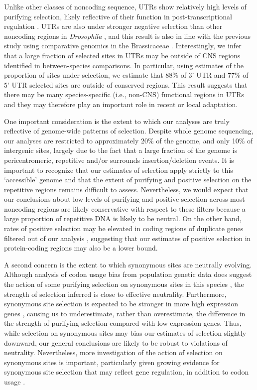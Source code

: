 Unlike other classes of noncoding sequence, UTRs show relatively high levels of purifying selection, likely reflective of their function in post-transcriptional regulation \citep{kim2014}. UTRs are also under stronger negative selection than other noncoding regions in \textit{Drosophila} \citep{andolfatto2005}, and this result is also in line with the previous study using comparative genomics in the Brassicaceae \citep{Haudry2013-qe}. Interestingly, we infer that a large fraction of selected sites in UTRs may be outside of CNS regions identified in between-species comparisons. In particular, using estimates of the proportion of sites under selection, we estimate that 88\% of 3’ UTR and 77\% of 5’ UTR selected sites are outside of conserved regions.  This result suggests that there may be many species-specific (i.e., non-CNS) functional regions in UTRs and they may therefore play an important role in recent or local adaptation.

One important consideration is the extent to which our analyses are truly reflective of genome-wide patterns of selection. Despite whole genome sequencing, our analyses are restricted to approximately 20\% of the genome, and only 10\% of intergenic sites, largely due to the fact that a large fraction of the genome is pericentromeric, repetitive and/or surrounds insertion/deletion events. It is important to recognize that our estimates of selection apply strictly to this ‘accessible’ genome and that the extent of purifying and positive selection on the repetitive regions remains difficult to assess. Nevertheless, we would expect that our conclusions about low levels of purifying and positive selection across most noncoding regions are likely conservative with respect to these filters because a large proportion of repetitive DNA is likely to be neutral. On the other hand, rates of positive selection may be elevated in coding regions of duplicate genes filtered out of our analysis \citep{han2009}, suggesting that our estimates of positive selection in protein-coding regions may also be a lower bound.   

A second concern is the extent to which synonymous sites are neutrally evolving. Although analysis of codon usage bias from population genetic data does suggest the action of some purifying selection on synonymous sites in this species \citep{qiu2011}, the strength of selection inferred is close to effective neutrality. Furthermore, synonymous site selection is expected to be stronger in more high expression genes \citep{park2013,wright2004}, causing us to underestimate, rather than overestimate, the difference in the strength of purifying selection compared with low expression genes. Thus, while selection on synonymous sites may bias our estimates of selection slightly downward, our general conclusions are likely to be robust to violations of neutrality. Nevertheless, more investigation of the action of selection on synonymous sites is important, particularly given growing evidence for synonymous site selection that may reflect gene regulation, in addition to codon usage \citep{duret1999,marais2001}.

